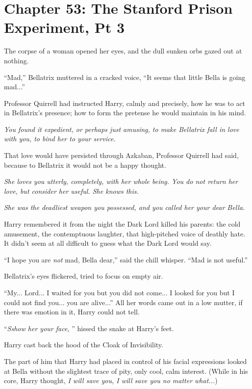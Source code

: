 \chapter{Chapter 53: The Stanford Prison Experiment, Pt 3}
The corpse of a woman opened her eyes, and the dull sunken orbs gazed
out at nothing.

``Mad,'' Bellatrix muttered in a cracked voice, ``It seems that little
Bella is going mad...''

Professor Quirrell had instructed Harry, calmly and precisely, how he
was to act in Bellatrix's presence; how to form the pretense he would
maintain in his mind.

\emph{You found it expedient, or perhaps just amusing, to make Bellatrix
fall in love with you, to bind her to your service.}

That love would have persisted through Azkaban, Professor Quirrell had
said, because to Bellatrix it would not be a happy thought.

\emph{She loves you utterly, completely, with her whole being. You do
not return her love, but consider her useful. She knows this.}

\emph{She was the deadliest weapon you possessed, and you called her
your dear Bella.}

Harry remembered it from the night the Dark Lord killed his parents: the
cold amusement, the contemptuous laughter, that high-pitched voice of
deathly hate. It didn't seem at all difficult to guess what the Dark
Lord would say.

``I hope you are \emph{not} mad, Bella dear,'' said the chill whisper.
``Mad is not useful.''

Bellatrix's eyes flickered, tried to focus on empty air.

``My... Lord... I waited for you but you did not come...
I looked for you but I could not find you... you are
alive...'' All her words came out in a low mutter, if there was
emotion in it, Harry could not tell.

``\emph{Sshow her your face,} '' hissed the snake at Harry's feet.

Harry cast back the hood of the Cloak of Invisibility.

The part of him that Harry had placed in control of his facial
expressions looked at Bella without the slightest trace of pity, only
cool, calm interest. (While in his core, Harry thought, \emph{I will
save you, I will save you no matter what...})

